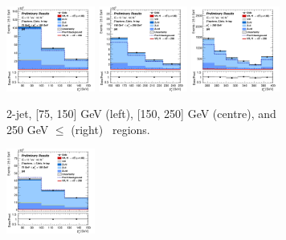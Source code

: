 \begin{figure}[h!]
    \centering
    \begin{subfigure}[b]{\textwidth}
        \centering
        \includegraphics[width=0.32\textwidth]{Images/VH/Own_fit/postfit_VHcc/Region_distpTV_BMax150_BMin75_DSR_J2_TTypeln_T1_L2_Y6051_GlobalFit_conditionnal_mu1.png}
        \includegraphics[width=0.32\textwidth]{Images/VH/Own_fit/postfit_VHcc/Region_distpTV_BMax250_BMin150_DSR_J2_TTypeln_T1_L2_Y6051_GlobalFit_conditionnal_mu1.png}
        \includegraphics[width=0.32\textwidth]{Images/VH/Own_fit/postfit_VHcc/Region_distpTV_BMin250_DSR_J2_TTypeln_T1_L2_Y6051_GlobalFit_conditionnal_mu1.png}
        \caption{2-jet, [75, 150] GeV (left), [150, 250] GeV (centre), and 250  GeV $\leq$ (right) \ptv\ regions.}
        \label{fig:plots_VHcc_2L_LN_2J}
    \end{subfigure}
    \begin{subfigure}[b]{\textwidth}
        \centering
        \includegraphics[width=0.32\textwidth]{Images/VH/Own_fit/postfit_VHcc/Region_distpTV_BMax150_BMin75_DSR_J3_TTypeln_incJet1_T1_L2_Y6051_GlobalFit_conditionnal_mu1.png}

\end{subfigure}
\end{figure}
